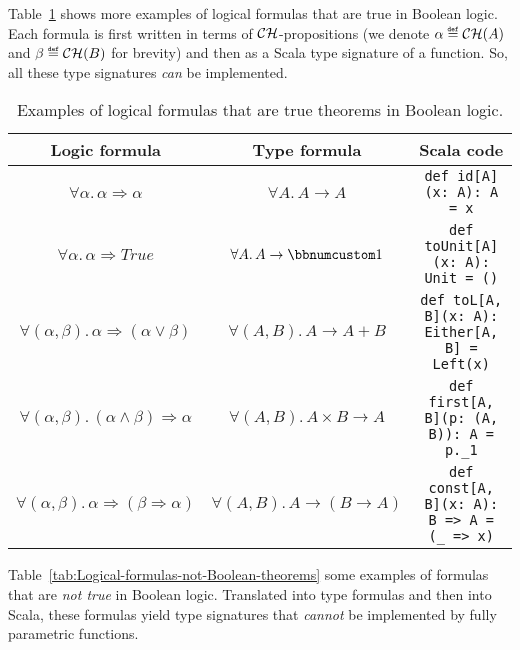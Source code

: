 Table~\ref{tab:Logical-formulas-Boolean-theorems} shows more examples
of logical formulas that are true in Boolean logic. Each formula is
first written in terms of ${\cal CH}$-propositions (we denote $\alpha\triangleq{\cal CH}(A)$
and $\beta\triangleq{\cal CH}(B)$ for brevity) and then as a Scala
type signature of a function. So, all these type signatures \emph{can}
be implemented.

\begin{table}[h]
\begin{centering}
\begin{tabular}{|c|c|c|}
\hline 
\textbf{\small{}Logic formula} & \textbf{\small{}Type formula} & \textbf{\small{}Scala code}\tabularnewline
\hline 
\hline 
{\footnotesize{}$\forall\alpha.\,\alpha\Rightarrow\alpha$} & {\footnotesize{}$\forall A.\,A\rightarrow A$} & \lstinline!def id[A](x: A): A = x!\tabularnewline
\hline 
{\footnotesize{}$\forall\alpha.\,\alpha\Rightarrow True$} & {\footnotesize{}$\forall A.\,A\rightarrow\bbnum 1$} & \lstinline!def toUnit[A](x: A): Unit = ()!\tabularnewline
\hline 
{\footnotesize{}$\forall(\alpha,\beta).\,\alpha\Rightarrow(\alpha\vee\beta)$} & {\footnotesize{}$\forall(A,B).\,A\rightarrow A+B$} & \lstinline!def toL[A, B](x: A): Either[A, B] = Left(x)!\tabularnewline
\hline 
{\footnotesize{}$\forall(\alpha,\beta).\,(\alpha\wedge\beta)\Rightarrow\alpha$} & {\footnotesize{}$\forall(A,B).\,A\times B\rightarrow A$} & \lstinline!def first[A, B](p: (A, B)): A = p._1!\tabularnewline
\hline 
{\footnotesize{}$\forall(\alpha,\beta).\,\alpha\Rightarrow(\beta\Rightarrow\alpha)$} & {\footnotesize{}$\forall(A,B).\,A\rightarrow(B\rightarrow A)$} & \lstinline!def const[A, B](x: A): B => A = (_ => x)!\tabularnewline
\hline 
\end{tabular}
\par\end{centering}
\caption{Examples of logical formulas that are true theorems in Boolean logic.\label{tab:Logical-formulas-Boolean-theorems}}
\end{table}

Table~\ref{tab:Logical-formulas-not-Boolean-theorems} some examples
of formulas that are \emph{not true} in Boolean logic. Translated
into type formulas and then into Scala, these formulas yield type
signatures that \emph{cannot} be implemented by fully parametric functions.

